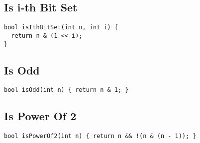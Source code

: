 \documentclass[twoside]{article}
\begin{document}
\begin{multicols*}{2}
\subsectionfont{\large\bfseries\sffamily\underline}
\subsection*{Is i-th Bit Set}
\begin{verbatim}
bool isIthBitSet(int n, int i) {
  return n & (1 << i);
}
\end{verbatim}

\subsectionfont{\large\bfseries\sffamily\underline}
\subsection*{Is Odd}
\begin{verbatim}
bool isOdd(int n) { return n & 1; }
\end{verbatim}

\subsectionfont{\large\bfseries\sffamily\underline}
\subsection*{Is Power Of 2}
\begin{verbatim}
bool isPowerOf2(int n) { return n && !(n & (n - 1)); }
\end{verbatim}

\end{multicols*}
\subsectionfont{\large\bfseries\sffamily\underline}
\end{document}
